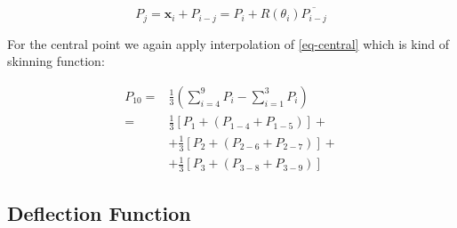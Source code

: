 \documentclass{egpubl}
\begin{document}
\begin{equation}
    P_j = \mathbf{x}_i + P_{i-j} = P_i + R(\theta_i) \overline{P_{i-j}}
\end{equation}

For the central point we again apply interpolation of \eqref{eq-central} which is kind of skinning function:

\begin{equation}\label{eq-central}
    \begin{split}
        P_{10} = & \frac{1}{3}(\sum_{i=4}^9 P_i - \sum_{i=1}^3 P_i)\\
               = & \frac{1}{3} \left[ P_1 + (P_{1-4} + P_{1-5}) \right] + \\
                & + \frac{1}{3} \left[ P_2 + (P_{2-6} + P_{2-7}) \right] + \\
                & + \frac{1}{3} \left[ P_3 + (P_{3-8} + P_{3-9}) \right]
    \end{split}
\end{equation}



\subsection{Deflection Function} %
\end{document}
